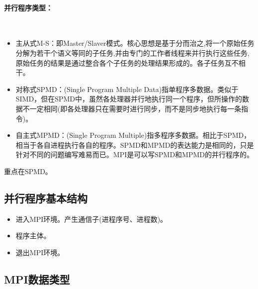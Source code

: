 \documentclass[UTF8]{article}%
\begin{document}
\paragraph{并行程序类型：}~{}

\begin{itemize}
    \item 主从式M-S：即Master/Slaver模式。核心思想是基于分而治之,将一个原始任务分解为若干个语义等同的子任务,并由专门的工作者线程来并行执行这些任务,原始任务的结果是通过整合各个子任务的处理结果形成的。各子任务互不相干。
    \item 对称式SPMD：(Single Program Multiple Data)指单程序多数据。类似于SIMD，但在SPMD中，虽然各处理器并行地执行同一个程序，但所操作的数据不一定相同(即各处理器只在需要时进行同步，而不是同步地执行每一条指令)。
    \item 自主式MPMD：(Single Program Multiple)指多程序多数据。相比于SPMD，相当于各自进程执行各自的程序。SPMD和MPMD的表达能力是相同的，只是针对不同的问题编写难易而已。MPI是可以写SPMD和MPMD的并行程序的。
\end{itemize}

重点在SPMD。

\subsection{并行程序基本结构}

\begin{itemize}
    \item 进入MPI环境。产生通信子(进程序号、进程数)。
    \item 程序主体。
    \item 退出MPI环境。
\end{itemize}

\subsection{MPI数据类型}
\end{document}
